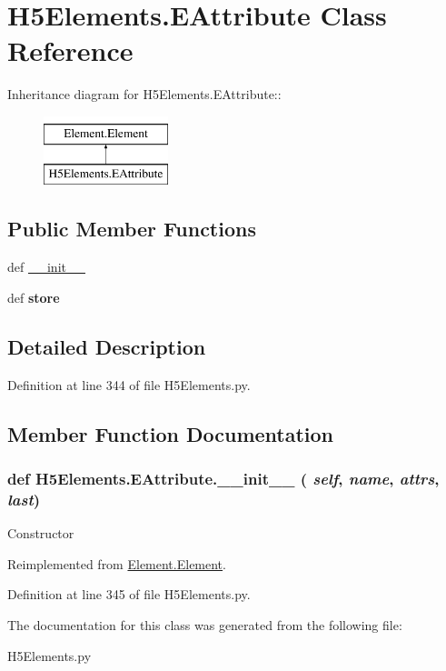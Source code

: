 \hypertarget{classH5Elements_1_1EAttribute}{
\section{H5Elements.EAttribute Class Reference}
\label{classH5Elements_1_1EAttribute}
}
Inheritance diagram for H5Elements.EAttribute::\begin{figure}[H]
\begin{center}
\leavevmode
\includegraphics[height=2cm]{classH5Elements_1_1EAttribute}
\end{center}
\end{figure}
\subsection*{Public Member Functions}
\begin{DoxyCompactItemize}
\item 
def \hyperlink{classH5Elements_1_1EAttribute_a42067c9a356fa17bbeb49de2acf9c438}{\_\-\_\-init\_\-\_\-}
\item 
\hypertarget{classH5Elements_1_1EAttribute_a0803bba087db250ff203d32f1facd69a}{
def {\bfseries store}}
\label{classH5Elements_1_1EAttribute_a0803bba087db250ff203d32f1facd69a}

\end{DoxyCompactItemize}


\subsection{Detailed Description}


Definition at line 344 of file H5Elements.py.

\subsection{Member Function Documentation}
\hypertarget{classH5Elements_1_1EAttribute_a42067c9a356fa17bbeb49de2acf9c438}{
\subsubsection[{\_\-\_\-init\_\-\_\-}]{\setlength{\rightskip}{0pt plus 5cm}def H5Elements.EAttribute.\_\-\_\-init\_\-\_\- ( {\em self}, \/   {\em name}, \/   {\em attrs}, \/   {\em last})}}
\label{classH5Elements_1_1EAttribute_a42067c9a356fa17bbeb49de2acf9c438}
\begin{DoxyVerb}Constructor \end{DoxyVerb}
 

Reimplemented from \hyperlink{classElement_1_1Element_a359371465b7c4d21611adec7e86c3b33}{Element.Element}.

Definition at line 345 of file H5Elements.py.

The documentation for this class was generated from the following file:\begin{DoxyCompactItemize}
\item 
H5Elements.py\end{DoxyCompactItemize}
